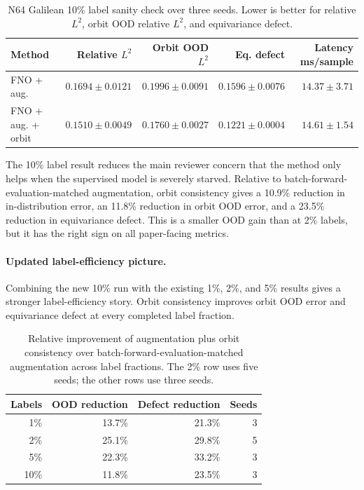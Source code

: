 \begin{table}[t]
\centering
\small
\caption{N64 Galilean 10\% label sanity check over three seeds. Lower is better for relative \(L^2\), orbit OOD relative \(L^2\), and equivariance defect.}
\label{tab:new-n64-10pct}
\begin{tabular}{lrrrr}
\toprule
Method & Relative \(L^2\) & Orbit OOD \(L^2\) & Eq. defect & Latency ms/sample \\
\midrule
FNO + aug. & \(0.1694\pm0.0121\) & \(0.1996\pm0.0091\) & \(0.1596\pm0.0076\) & \(14.37\pm3.71\) \\
FNO + aug. + orbit & \(\mathbf{0.1510\pm0.0049}\) & \(\mathbf{0.1760\pm0.0027}\) & \(\mathbf{0.1221\pm0.0004}\) & \(14.61\pm1.54\) \\
\bottomrule
\end{tabular}
\end{table}

The 10\% label result reduces the main reviewer concern that the method only helps when the supervised model is severely starved. Relative to batch-forward-evaluation-matched augmentation, orbit consistency gives a 10.9\% reduction in in-distribution error, an 11.8\% reduction in orbit OOD error, and a 23.5\% reduction in equivariance defect. This is a smaller OOD gain than at 2\% labels, but it has the right sign on all paper-facing metrics.

\paragraph{Updated label-efficiency picture.} Combining the new 10\% run with the existing 1\%, 2\%, and 5\% results gives a stronger label-efficiency story. Orbit consistency improves orbit OOD error and equivariance defect at every completed label fraction.

\begin{table}[t]
\centering
\small
\caption{Relative improvement of augmentation plus orbit consistency over batch-forward-evaluation-matched augmentation across label fractions. The 2\% row uses five seeds; the other rows use three seeds.}
\label{tab:new-label-efficiency}
\begin{tabular}{rrrr}
\toprule
Labels & OOD reduction & Defect reduction & Seeds \\
\midrule
1\% & 13.7\% & 21.3\% & 3 \\
2\% & 25.1\% & 29.8\% & 5 \\
5\% & 22.3\% & 33.2\% & 3 \\
10\% & 11.8\% & 23.5\% & 3 \\
\bottomrule
\end{tabular}
\end{table}

